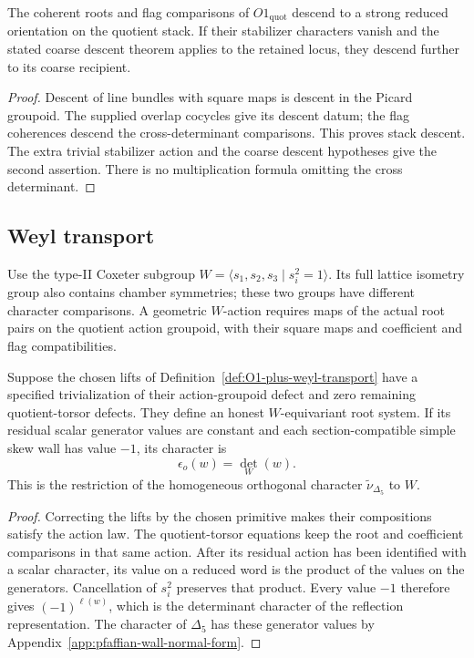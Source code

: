 \begin{theorem}
\label{thm:G-O1}
The coherent roots and flag comparisons of
\(O1_{\mathrm{quot}}\) descend to a strong reduced orientation
on the quotient stack. If their stabilizer characters vanish and
the stated coarse descent theorem applies to the retained locus,
they descend further to its coarse recipient.
\end{theorem}
\begin{proof}
Descent of line bundles with square maps is descent in the Picard
groupoid. The supplied overlap cocycles give its descent datum;
the flag coherences descend the cross-determinant comparisons.
This proves stack descent. The extra trivial stabilizer action
and the coarse descent hypotheses give the second assertion.
There is no multiplication formula omitting the cross determinant.
\end{proof}

\subsection{Weyl transport}
\label{app:G-O1-plus-discharge}

Use the type-II Coxeter subgroup
\(W=\langle s_1,s_2,s_3\mid s_i^2=1\rangle\).
Its full lattice isometry group also contains chamber symmetries;
these two groups have different character comparisons.
A geometric \(W\)-action requires maps of the actual root pairs
on the quotient action groupoid, with their square maps and
coefficient and flag compatibilities.

\begin{theorem}
\label{thm:G-O1-plus}
Suppose the chosen lifts of
Definition~\ref{def:O1-plus-weyl-transport} have a specified
trivialization of their action-groupoid defect and zero remaining
quotient-torsor defects. They define an honest \(W\)-equivariant
root system. If its residual scalar generator values are constant
and each section-compatible simple skew wall has value \(-1\),
its character is
\[
 \epsilon_o(w)=\det_W(w).
\]
This is the restriction of the homogeneous orthogonal character
\(\widetilde\nu_{\Delta_5}\) to \(W\).
\end{theorem}
\begin{proof}
Correcting the lifts by the chosen primitive makes their
compositions satisfy the action law. The quotient-torsor equations
keep the root and coefficient comparisons in that same action.
After its residual action has been identified with a scalar
character, its value on a reduced word is the product of the
values on the generators. Cancellation of \(s_i^2\) preserves
that product. Every value \(-1\) therefore gives \((-1)^{\ell(w)}\),
which is the determinant character of the reflection representation.
The character of \(\Delta_5\) has these generator values by
Appendix~\ref{app:pfaffian-wall-normal-form}.
\end{proof}

